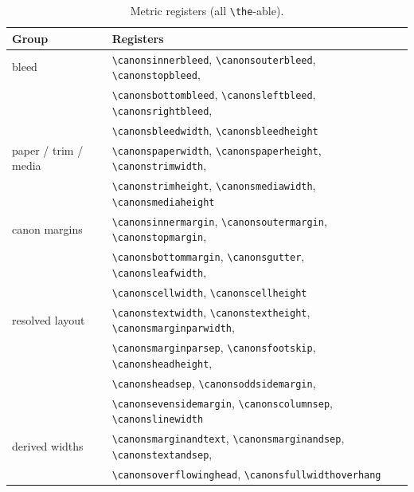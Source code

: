 \documentclass[11pt, twoside, openany]{book}
\newcommand{\cmd}[1]{\texttt{\textbackslash #1}}
\begin{document}
\begin{table}[h]
	\centering
	\caption{Metric registers (all \cmd{the}-able).}
	\label{tab:metrics}
	\begin{tabular}{@{}ll@{}}
		\toprule
		\textbf{Group}        & \textbf{Registers}                                                          \\
		\midrule
		bleed                 & \cmd{canonsinnerbleed}, \cmd{canonsouterbleed}, \cmd{canonstopbleed},        \\
		                      & \cmd{canonsbottombleed}, \cmd{canonsleftbleed}, \cmd{canonsrightbleed},      \\
		                      & \cmd{canonsbleedwidth}, \cmd{canonsbleedheight}                              \\
		paper / trim / media  & \cmd{canonspaperwidth}, \cmd{canonspaperheight}, \cmd{canonstrimwidth},      \\
		                      & \cmd{canonstrimheight}, \cmd{canonsmediawidth}, \cmd{canonsmediaheight}      \\
		canon margins         & \cmd{canonsinnermargin}, \cmd{canonsoutermargin}, \cmd{canonstopmargin},     \\
		                      & \cmd{canonsbottommargin}, \cmd{canonsgutter}, \cmd{canonsleafwidth},         \\
		                      & \cmd{canonscellwidth}, \cmd{canonscellheight}                               \\
		resolved layout       & \cmd{canonstextwidth}, \cmd{canonstextheight}, \cmd{canonsmarginparwidth},   \\
		                      & \cmd{canonsmarginparsep}, \cmd{canonsfootskip}, \cmd{canonsheadheight},      \\
		                      & \cmd{canonsheadsep}, \cmd{canonsoddsidemargin},                             \\
		                      & \cmd{canonsevensidemargin}, \cmd{canonscolumnsep}, \cmd{canonslinewidth}     \\
		derived widths        & \cmd{canonsmarginandtext}, \cmd{canonsmarginandsep}, \cmd{canonstextandsep}, \\
		                      & \cmd{canonsoverflowinghead}, \cmd{canonsfullwidthoverhang}                  \\
		\bottomrule
	\end{tabular}
\end{table}
\end{document}

